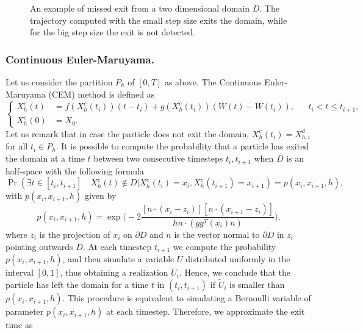 \begin{figure}[t]
    \centering
    \resizebox{0.6\linewidth}{!}{ }  
    \caption{An example of missed exit from a two dimensional domain $D$. The trajectory computed with the small step size exits the domain, while for the big step size the exit is not detected.}
    \label{fig:MissedExit}
\end{figure}
 
\subsubsection{Continuous Euler-Maruyama. }
Let us consider the partition $P_h$ of $[0,T]$ as above. The Continuous Euler-Maruyama (CEM) method is defined as
\begin{equation}\label{eq:CEM}
	\left \{
	\begin{aligned}
		X_h^c(t) &= f(X_h^c(t_i))(t-t_i) + g(X_h^c(t_i))(W(t) - W(t_{i})),  && t_i < t \leq t_{i+1},\\
		X_h^c(0) &= X_0.
	\end{aligned} \right .
\end{equation} 
Let us remark that in case the particle does not exit the domain, $X_h^c(t_i) = X_{h,i}^d$ for all $t_i \in P_h$. It is possible to compute the probability that a particle has exited the domain at a time $t$ between two consecutive timesteps $t_i,t_{i+1}$ when $D$ is an half-space with the following formula \cite{Gobet2001}
\begin{equation}\label{eq:CEMProb}
	\Pr (\exists t \in [ t_i,t_{i+1} ] \quad X_h^c(t) \notin D | X_h^c(t_i) = x_i, X_h^c(t_{i+1}) = x_{i+1}) = p(x_i,x_{i+1},h),
\end{equation}
with $p(x_i,x_{i+1},h)$ given by
\begin{equation}\label{eq:CEMProbHalfSpace}
	p(x_i,x_{i+1},h) = \exp\Big(-2\frac{[n\cdot(x_i - z_i)][n\cdot(x_{i+1} - z_i)]}{hn\cdot (gg^T(x_i)n)}\Big),
\end{equation}
where $z_i$ is the projection of $x_i$ on $\partial D$ and $n$ is the vector normal to $\partial D$ in $z_i$ pointing outwards $D$. At each timestep $t_{i+1}$ we compute the probability $p(x_i,x_{i+1},h)$, and then simulate a variable $U$ distributed uniformly in the interval $\left[0,1\right]$, thus obtaining a realization $\tilde U_i$. Hence, we conclude that the particle has left the domain for a time $t$ in $(t_i,t_{i+1})$ if $\tilde U_i$ is smaller than $p(x_i,x_{i+1},h)$. This procedure is equivalent to simulating a Bernoulli variable of parameter $p(x_i,x_{i+1},h)$ at each timestep. Therefore, we approximate the exit time as
